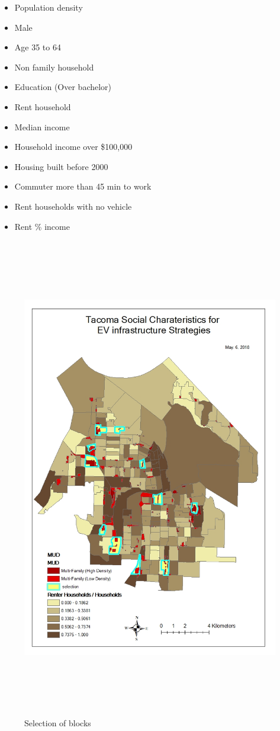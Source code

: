 \documentclass[]{article}
\providecommand{\tightlist}{%
  \setlength{\itemsep}{0pt}\setlength{\parskip}{0pt}}
\begin{document}
\begin{itemize}
\tightlist
\item
  Population density
\item
  Male
\item
  Age 35 to 64
\item
  Non family household
\item
  Education (Over bachelor)
\item
  Rent household
\item
  Median income
\item
  Household income over \$100,000
\item
  Housing built before 2000
\item
  Commuter more than 45 min to work
\item
  Rent households with no vehicle
\item
  Rent \% income
\end{itemize}

\begin{figure}
\centering
\includegraphics[height=8.33333in]{./figs/selection.jpg}
\caption{Selection of blocks}
\end{figure}
\end{document}
